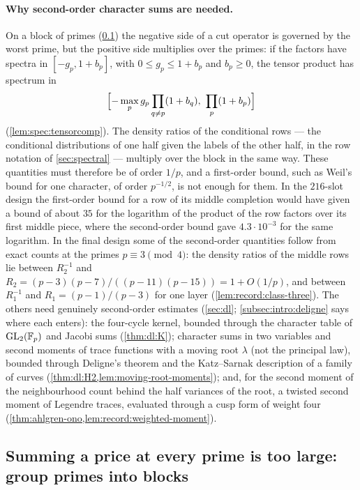 \paragraph{Why second-order character sums are needed.}
On a block of primes (\cref{subsec:walk:blocks}) the negative side of a cut
operator is governed by the worst prime, but the positive side multiplies over
the primes: if the factors have spectra in $[-g_p,1+b_p]$, with
$0\le g_p\le1+b_p$ and $b_p\ge0$, the tensor product has spectrum in
\[
 \Bigl[-\max_pg_p\prod_{q\ne p}(1+b_q),\ \prod_p(1+b_p)\Bigr]
\]
(\cref{lem:spec:tensorcomp}). The density ratios of the
conditional rows --- the conditional distributions of one half
given the labels of the other half, in the row notation of
\cref{sec:spectral} --- multiply over the block in the same way. These quantities must therefore be of
order $1/p$, and a first-order bound, such as Weil's bound for one character,
of order $p^{-1/2}$, is not enough for them. In the $216$-slot design the
first-order bound for a row of its middle completion would have
given a bound of about $35$ for the logarithm of the product of
the row factors over its first middle piece, where the
second-order bound gave $4.3\cdot10^{-3}$ for the same logarithm. In the final design some of the second-order quantities
follow from exact counts at the primes $p\equiv3\pmod4$: the density ratios of
the middle rows lie between $R_2^{-1}$ and
$R_2=(p-3)(p-7)/((p-11)(p-15))=1+O(1/p)$, and between $R_1^{-1}$ and
$R_1=(p-1)/(p-3)$ for one layer (\cref{lem:record:class-three}). The others need
genuinely second-order estimates (\cref{sec:dl}; \cref{subsec:intro:deligne}
says where each enters): the four-cycle kernel, bounded through the character
table of $\mathrm{GL}_2(\mathbb F_p)$ and Jacobi sums (\cref{thm:dl:K}); character
sums in two variables and second moments of trace functions with
a moving root $\lambda$ (not the principal law), bounded through
Deligne's theorem and the Katz--Sarnak description of a family
of curves (\cref{thm:dl:H2,lem:moving-root-moments}); and, for the second moment
of the neighbourhood count behind the half variances of the root, a twisted
second moment of Legendre traces, evaluated through a cusp form of weight four
(\cref{thm:ahlgren-ono,lem:record:weighted-moment}).

\subsection{Summing a price at every prime is too large: group primes into blocks}\label{subsec:walk:blocks}


